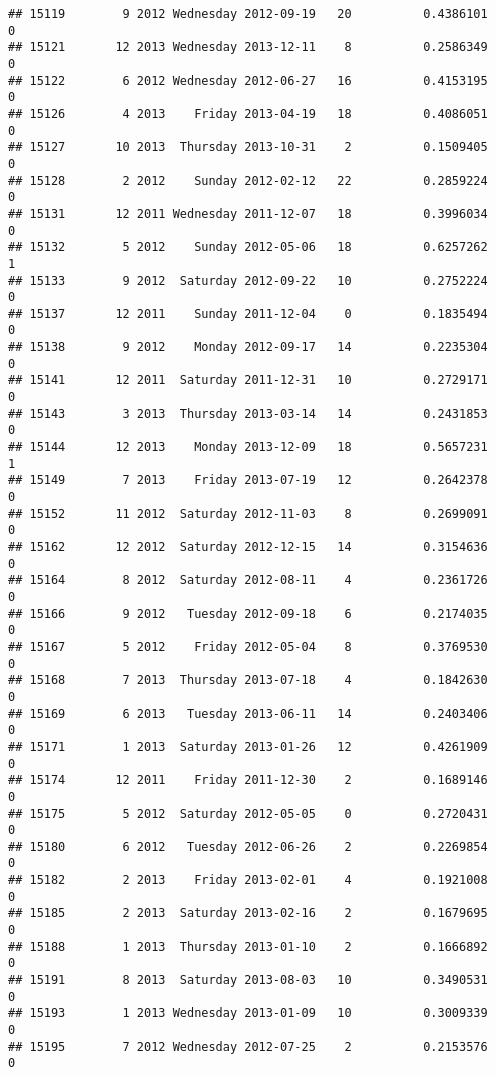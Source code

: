 \documentclass[
]{article}
\begin{document}
\begin{verbatim}
## 15119        9 2012 Wednesday 2012-09-19   20          0.4386101             0
## 15121       12 2013 Wednesday 2013-12-11    8          0.2586349             0
## 15122        6 2012 Wednesday 2012-06-27   16          0.4153195             0
## 15126        4 2013    Friday 2013-04-19   18          0.4086051             0
## 15127       10 2013  Thursday 2013-10-31    2          0.1509405             0
## 15128        2 2012    Sunday 2012-02-12   22          0.2859224             0
## 15131       12 2011 Wednesday 2011-12-07   18          0.3996034             0
## 15132        5 2012    Sunday 2012-05-06   18          0.6257262             1
## 15133        9 2012  Saturday 2012-09-22   10          0.2752224             0
## 15137       12 2011    Sunday 2011-12-04    0          0.1835494             0
## 15138        9 2012    Monday 2012-09-17   14          0.2235304             0
## 15141       12 2011  Saturday 2011-12-31   10          0.2729171             0
## 15143        3 2013  Thursday 2013-03-14   14          0.2431853             0
## 15144       12 2013    Monday 2013-12-09   18          0.5657231             1
## 15149        7 2013    Friday 2013-07-19   12          0.2642378             0
## 15152       11 2012  Saturday 2012-11-03    8          0.2699091             0
## 15162       12 2012  Saturday 2012-12-15   14          0.3154636             0
## 15164        8 2012  Saturday 2012-08-11    4          0.2361726             0
## 15166        9 2012   Tuesday 2012-09-18    6          0.2174035             0
## 15167        5 2012    Friday 2012-05-04    8          0.3769530             0
## 15168        7 2013  Thursday 2013-07-18    4          0.1842630             0
## 15169        6 2013   Tuesday 2013-06-11   14          0.2403406             0
## 15171        1 2013  Saturday 2013-01-26   12          0.4261909             0
## 15174       12 2011    Friday 2011-12-30    2          0.1689146             0
## 15175        5 2012  Saturday 2012-05-05    0          0.2720431             0
## 15180        6 2012   Tuesday 2012-06-26    2          0.2269854             0
## 15182        2 2013    Friday 2013-02-01    4          0.1921008             0
## 15185        2 2013  Saturday 2013-02-16    2          0.1679695             0
## 15188        1 2013  Thursday 2013-01-10    2          0.1666892             0
## 15191        8 2013  Saturday 2013-08-03   10          0.3490531             0
## 15193        1 2013 Wednesday 2013-01-09   10          0.3009339             0
## 15195        7 2012 Wednesday 2012-07-25    2          0.2153576             0

\end{verbatim}
\end{document}
